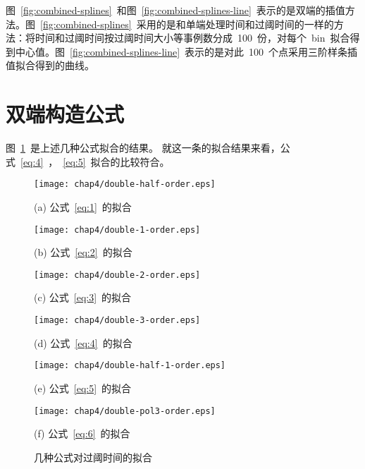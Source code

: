 图~\ref{fig:combined-splines}~和图~\ref{fig:combined-splines-line}~表示的是双端的插值方法。图~\ref{fig:combined-splines}~采用的是和单端处理时间和过阈时间的一样的方法：将时间和过阈时间按过阈时间大小等事例数分成~100~份，对每个~bin~拟合得到中心值。图~\ref{fig:combined-splines-line}~表示的是对此~100~个点采用三阶样条插值拟合得到的曲线。

\section{双端构造公式}

图~\ref{fig:single-formula}~是上述几种公式拟合的结果。
就这一条的拟合结果来看，公式~\ref{eq:4}~，~\ref{eq:5}~拟合的比较符合。

\begin{figure}[!h]
\begin{minipage}{0.5\linewidth}
  \centerline{\texttt{[image: chap4/double-half-order.eps]}}
  \centerline{(a) 公式~\ref{eq:1}~的拟合}
  \centerline{\label{fig:double-half-order}}
\end{minipage}
\hfill
\begin{minipage}{0.5\linewidth}
  \centerline{\texttt{[image: chap4/double-1-order.eps]}}
  \centerline{(b) 公式~\ref{eq:2}~的拟合}
  \centerline{\label{fig:double-1-order}}
\end{minipage}
\vfill
\begin{minipage}{0.5\linewidth}
  \centerline{\texttt{[image: chap4/double-2-order.eps]}}
  \centerline{(c) 公式~\ref{eq:3}~的拟合}
  \centerline{\label{fig:double-2-order}}
\end{minipage}
\hfill
\begin{minipage}{0.5\linewidth}
  \centerline{\texttt{[image: chap4/double-3-order.eps]}}
  \centerline{(d) 公式~\ref{eq:4}~的拟合}
  \centerline{\label{fig:double-3-order}}
\end{minipage}
\vfill
\begin{minipage}{0.5\linewidth}
  \centerline{\texttt{[image: chap4/double-half-1-order.eps]}}
  \centerline{(e) 公式~\ref{eq:5}~的拟合}
  \centerline{\label{fig:double-half-1-order}}
\end{minipage}
\hfill
\begin{minipage}{0.5\linewidth}
  \centerline{\texttt{[image: chap4/double-pol3-order.eps]}}
  \centerline{(f) 公式~\ref{eq:6}~的拟合}
  \centerline{\label{fig:double-pol3-order}}
\end{minipage}
\caption{几种公式对过阈时间的拟合}
\label{fig:single-formula}
\end{figure}

